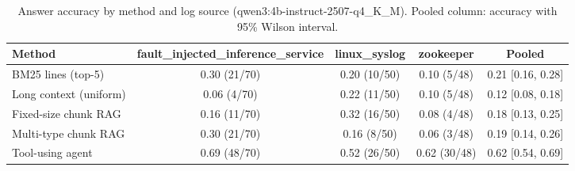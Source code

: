 \begin{table}[t]
\centering
\caption{Answer accuracy by method and log source (qwen3:4b-instruct-2507-q4_K_M). Pooled column: accuracy with 95\% Wilson interval.}
\label{tab:main_comparison__qwen3_4b_instruct}
\begin{tabular}{@{}lcccc@{}}
\toprule
Method & fault\_injected\_inference\_service & linux\_syslog & zookeeper & Pooled \\
\midrule
BM25 lines (top-5) & 0.30 (21/70) & 0.20 (10/50) & 0.10 (5/48) & 0.21 [0.16, 0.28] \\
Long context (uniform) & 0.06 (4/70) & 0.22 (11/50) & 0.10 (5/48) & 0.12 [0.08, 0.18] \\
Fixed-size chunk RAG & 0.16 (11/70) & 0.32 (16/50) & 0.08 (4/48) & 0.18 [0.13, 0.25] \\
Multi-type chunk RAG & 0.30 (21/70) & 0.16 (8/50) & 0.06 (3/48) & 0.19 [0.14, 0.26] \\
Tool-using agent & 0.69 (48/70) & 0.52 (26/50) & 0.62 (30/48) & 0.62 [0.54, 0.69] \\
\bottomrule
\end{tabular}
\end{table}
